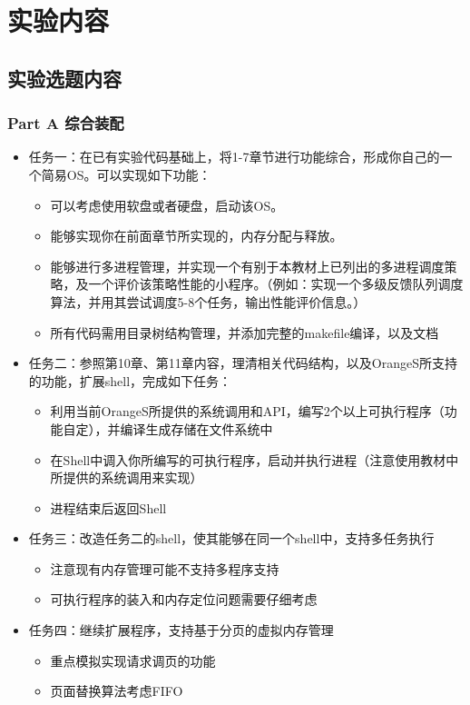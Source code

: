 \documentclass{whureport}
\begin{document}
\thispagestyle{empty}
\tableofcontents
\makeheader
\setcounter{page}{1}
\section{实验内容}
\subsection{实验选题内容}
\subsubsection{Part A 综合装配}
\begin{itemize}
  \item 任务一：在已有实验代码基础上，将1-7章节进行功能综合，形成你自己的一个简易OS。可以实现如下功能：
  \begin{itemize}
  \item 可以考虑使用软盘或者硬盘，启动该OS。
  \item 能够实现你在前面章节所实现的，内存分配与释放。
	\item 能够进行多进程管理，并实现一个有别于本教材上已列出的多进程调度策略，及一个评价该策略性能的小程序。（例如：实现一个多级反馈队列调度算法，并用其尝试调度5-8个任务，输出性能评价信息。）
	\item 所有代码需用目录树结构管理，并添加完整的makefile编译，以及文档
\end{itemize}
	\item 任务二：参照第10章、第11章内容，理清相关代码结构，以及OrangeS所支持的功能，扩展shell，完成如下任务：
\begin{itemize}
  \item 利用当前OrangeS所提供的系统调用和API，编写2个以上可执行程序（功能自定），并编译生成存储在文件系统中
\item 在Shell中调入你所编写的可执行程序，启动并执行进程（注意使用教材中所提供的系统调用来实现）
\item 进程结束后返回Shell
\end{itemize}
\item 任务三：改造任务二的shell，使其能够在同一个shell中，支持多任务执行
\begin{itemize}
  \item 注意现有内存管理可能不支持多程序支持
\item 可执行程序的装入和内存定位问题需要仔细考虑
\end{itemize}
\item 任务四：继续扩展程序，支持基于分页的虚拟内存管理
\begin{itemize}
  \item 重点模拟实现请求调页的功能
  \item 页面替换算法考虑FIFO
\end{itemize}

\end{itemize}
\end{document}
